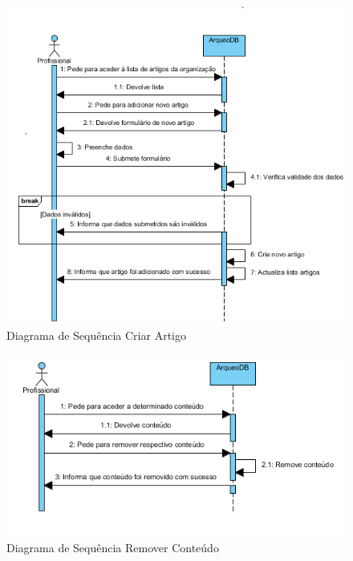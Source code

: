 ﻿\documentclass[12pt,a4paper]{article}
\begin{document}
\begin{figure}[h!]
\centering
\includegraphics[scale=0.8]{sequencia/criarartigo}
\caption{Diagrama de Sequência Criar Artigo} 
\end{figure}


\begin{figure}[h!]
\centering
\includegraphics[scale=0.8]{sequencia/removerconteudo}
\caption{Diagrama de Sequência Remover Conteúdo} 
\end{figure} 
\end{document}
